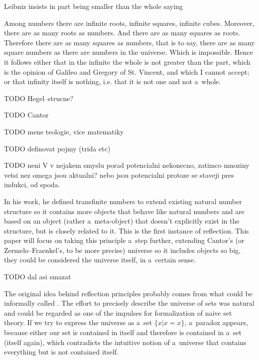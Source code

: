 Leibniz insists in part being smaller than the whole saying
\begin{displayquote}
Among numbers there are infinite roots, infinite squares, infinite cubes. Moreover, there are
as many roots as numbers. And there are as many squares as roots. Therefore there are as
many squares as numbers, that is to say, there are as many square numbers as there are
numbers in the universe. Which is impossible. Hence it follows either that in the infinite the
whole is not greater than the part, which is the opinion of Galileo and Gregory of St.
Vincent, and which I cannot accept; or that infinity itself is nothing, i.e. that it is not one and
not a~whole. %
\end{displayquote}

TODO  Hegel--strucne?

TODO Cantor

TODO mene teologie, vice matematiky

TODO definovat pojmy (trida etc)

TODO neni V v nejakem smyslu porad potencialni nekonecno, zatimco mnoziny vetsi nez omega jsou aktualni? nebo jsou potencialni protoze se staveji pres indukci, od spoda.

In his work, he defined transfinite numbers to extend existing natural number %
structure so it contains more objects that behave like natural numbers and are based on an object (rather a~meta-object) that doesn't explicitly exist in the structure, but is closely related to it. This is the first instance of reflection. 
This paper will focus on taking this principle a~step further, extending Cantor's (or Zermelo–Fraenkel's, to be more precise) universe so it includes objects so big, they could be considered the universe itself, in a~certain sense. %


TODO dal asi smazat


The original idea behind reflection principles probably comes from what could be informally called .
The effort to precisely describe the universe of sets was natural and could be regarded as one of the impulses for formalization of naive set theory.
If we try to express the universe as a~set $\{x  |  x = x\}$, a~paradox appears, because either our set is contained in itself and therefore is contained in a~set (itself again), which contradicts the intuitive notion of a~universe that contains everything but is not contained itself.

